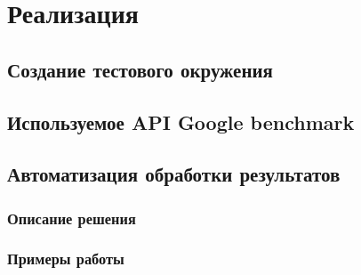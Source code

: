 \section{Реализация}
	\subsection{Создание тестового окружения}
	\label{title:chapter2:testing_environment_description}
	
	\subsection{Используемое API Google benchmark}
	\label{title:chapter2:testing_google_benchmark_api}
	
%		
		
	\subsection{Автоматизация обработки результатов}
	\label{title:chapter2:testing_analyser}
		\subsubsection{Описание решения}
		\label{title:chapter2:testing_analyser_description}
		
		\subsubsection{Примеры работы}
		\label{title:chapter2:analyser_examples}
		
